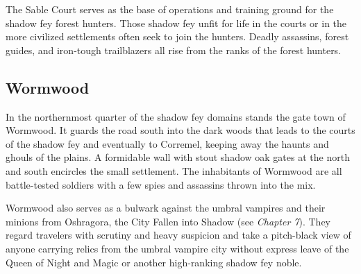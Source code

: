 \documentclass[10pt,a4paper,twoside,bg=print,twocolumn,openany,nodeprecatedcode]{dndbook}
\begin{document}
The Sable Court serves as the base of operations and training ground for the shadow fey forest hunters. Those shadow fey unfit for life in the courts or in the more civilized settlements often seek to join the hunters. Deadly assassins, forest guides, and iron-tough trailblazers all rise from the ranks of the forest hunters.

\subsection{Wormwood}
In the northernmost quarter of the shadow fey domains stands the gate town of Wormwood. It guards the road south into the dark woods that leads to the courts of the shadow fey and eventually to Corremel, keeping away the haunts and ghouls of the plains. A formidable wall with stout shadow oak gates at the north and south encircles the small settlement. The inhabitants of Wormwood are all battle-tested soldiers with a few spies and assassins thrown into the mix.

Wormwood also serves as a bulwark against the umbral vampires and their minions from Oshragora, the City Fallen into Shadow (see \textit{Chapter 7}). They regard travelers with scrutiny and heavy suspicion and take a pitch-black view of anyone carrying relics from the umbral vampire city without express leave of the Queen of Night and Magic or another high-ranking shadow fey noble.
\end{document}
